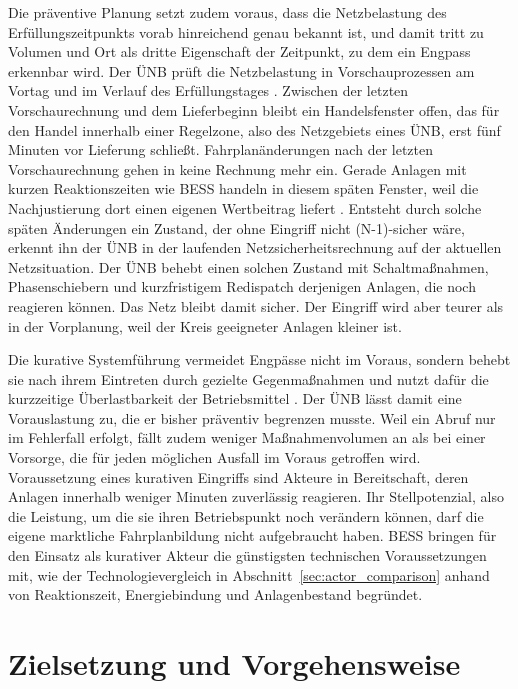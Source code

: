 Die präventive Planung setzt zudem voraus, dass die Netzbelastung des Erfüllungszeitpunkts vorab hinreichend genau bekannt ist, und damit tritt zu Volumen und Ort als dritte Eigenschaft der Zeitpunkt, zu dem ein Engpass erkennbar wird.
Der \ac{ÜNB} prüft die Netzbelastung in Vorschauprozessen am Vortag und im Verlauf des Erfüllungstages \cite{leeuwen_integration_2020}.
Zwischen der letzten Vorschaurechnung und dem Lieferbeginn bleibt ein Handelsfenster offen, das für den Handel innerhalb einer Regelzone, also des Netzgebiets eines \ac{ÜNB}, erst fünf Minuten vor Lieferung schließt.
Fahrplanänderungen nach der letzten Vorschaurechnung gehen in keine Rechnung mehr ein.
Gerade Anlagen mit kurzen Reaktionszeiten wie \ac{BESS} handeln in diesem späten Fenster, weil die Nachjustierung dort einen eigenen Wertbeitrag liefert \cite{mahgoub_wie_2025, hornek_value_2025}.
Entsteht durch solche späten Änderungen ein Zustand, der ohne Eingriff nicht (N-1)-sicher wäre, erkennt ihn der \ac{ÜNB} in der laufenden Netzsicherheitsrechnung auf der aktuellen Netzsituation.
Der \ac{ÜNB} behebt einen solchen Zustand mit Schaltmaßnahmen, Phasenschiebern und kurzfristigem Redispatch derjenigen Anlagen, die noch reagieren können.
Das Netz bleibt damit sicher.
Der Eingriff wird aber teurer als in der Vorplanung, weil der Kreis geeigneter Anlagen kleiner ist.

Die kurative Systemführung vermeidet Engpässe nicht im Voraus, sondern behebt sie nach ihrem Eintreten durch gezielte Gegenmaßnahmen und nutzt dafür die kurzzeitige Überlastbarkeit der Betriebsmittel \cite{innosys_2030_gesamtverbund_innovationen_2021}.
Der \ac{ÜNB} lässt damit eine Vorauslastung zu, die er bisher präventiv begrenzen musste.
Weil ein Abruf nur im Fehlerfall erfolgt, fällt zudem weniger Maßnahmenvolumen an als bei einer Vorsorge, die für jeden möglichen Ausfall im Voraus getroffen wird.
Voraussetzung eines kurativen Eingriffs sind Akteure in Bereitschaft, deren Anlagen innerhalb weniger Minuten zuverlässig reagieren.
Ihr Stellpotenzial, also die Leistung, um die sie ihren Betriebspunkt noch verändern können, darf die eigene marktliche Fahrplanbildung nicht aufgebraucht haben.
\ac{BESS} bringen für den Einsatz als kurativer Akteur die günstigsten technischen Voraussetzungen mit, wie der Technologievergleich in Abschnitt~\ref{sec:actor_comparison} anhand von Reaktionszeit, Energiebindung und Anlagenbestand begründet.

\section{Zielsetzung und Vorgehensweise}
\label{sec:research_questions}
\label{sec:structure}

